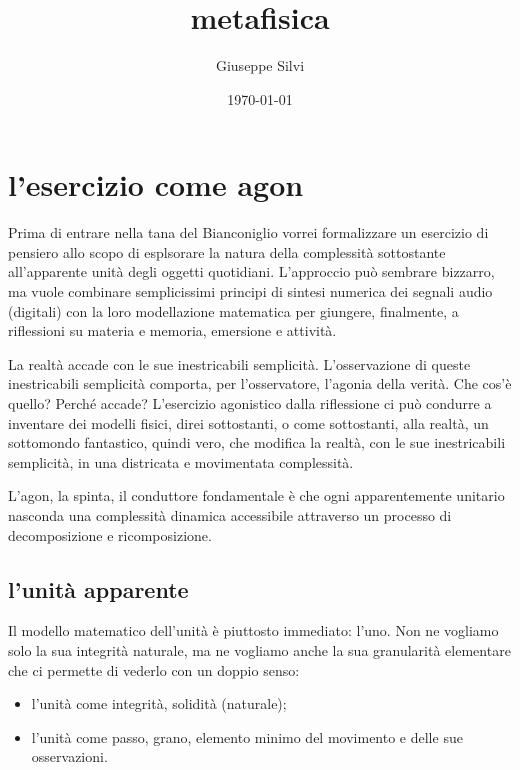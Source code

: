 \documentclass[a4paper,11pt]{article}
\title{metafisica}
\author{Giuseppe Silvi}
\date{\today}
\providecommand{\tightlist}{%
  \setlength{\itemsep}{0pt}\setlength{\parskip}{0pt}}
\begin{document}
\maketitle

\section{l'esercizio come agon}\label{lesercizio-come-agon}

Prima di entrare nella tana del Bianconiglio vorrei formalizzare un
esercizio di pensiero allo scopo di esplsorare la natura della
complessità sottostante all'apparente unità degli oggetti quotidiani.
L'approccio può sembrare bizzarro, ma vuole combinare semplicissimi
principi di sintesi numerica dei segnali audio (digitali) con la loro
modellazione matematica per giungere, finalmente, a riflessioni su
materia e memoria, emersione e attività.

La realtà accade con le sue inestricabili semplicità. L'osservazione di
queste inestricabili semplicità comporta, per l'osservatore, l'agonia
della verità. Che cos'è quello? Perché accade? L'esercizio agonistico
dalla riflessione ci può condurre a inventare dei modelli fisici, direi
sottostanti, o come sottostanti, alla realtà, un sottomondo fantastico,
quindi vero, che modifica la realtà, con le sue inestricabili
semplicità, in una districata e movimentata complessità.

L'agon, la spinta, il conduttore fondamentale è che ogni apparentemente
unitario nasconda una complessità dinamica accessibile attraverso un
processo di decomposizione e ricomposizione.

\subsection{l'unità apparente}\label{lunituxe0-apparente}

Il modello matematico dell'unità è piuttosto immediato: l'uno. Non ne
vogliamo solo la sua integrità naturale, ma ne vogliamo anche la sua
granularità elementare che ci permette di vederlo con un doppio senso:

\begin{itemize}
\tightlist
\item
  l'unità come integrità, solidità (naturale);
\item
  l'unità come passo, grano, elemento minimo del movimento e delle sue
  osservazioni.
\end{itemize}
\end{document}
